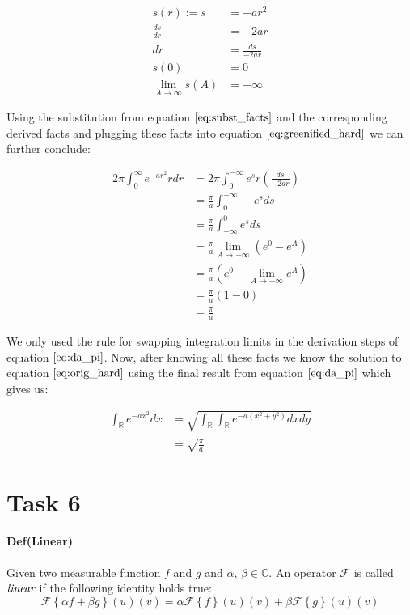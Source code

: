 \documentclass{paper}
\begin{document}
\begin{align}
    s(r) := s &= -ar^2 \\
    \frac{ds}{dr} &= -2ar \\
    dr &= \frac{ds}{-2ar} \\
    s(0) &= 0 \\
    \lim_{A \rightarrow \infty} s(A) &= -\infty
\label{eq:subst_facts}
\end{align}

Using the substitution from equation $\ref{eq:subst_facts}$ and the corresponding derived facts and plugging these facts into equation $\ref{eq:greenified_hard}$ we can further conclude:

\begin{align}
    2\pi \int_{0}^{\infty} e^{-ar^2} r dr 
    &= 2\pi \int_{0}^{-\infty} e^{s} r (\frac{ds}{-2ar}) \\
    &= \frac{\pi}{a} \int_{0}^{-\infty} -e^{s} ds \\
    &= \frac{\pi}{a} \int_{-\infty}^{0} e^{s} ds \\
    &= \frac{\pi}{a} \lim_{A \rightarrow -\infty} \left( e^0 - e^{A} \right) \\
    &= \frac{\pi}{a} \left( e^0 - \lim_{A \rightarrow -\infty} e^{A} \right) \\
    &= \frac{\pi}{a} (1 - 0) \\
    &= \frac{\pi}{a}
\label{eq:da_pi}
\end{align}

We only used the rule for swapping integration limits in the derivation steps of equation $\ref{eq:da_pi}$. Now, after knowing all these facts we know the solution to equation $\ref{eq:orig_hard}$ using the final result from equation $\ref{eq:da_pi}$ which gives us:

\begin{align}
    \int_{\mathbb{R}} e^{-ax^2} dx 
    &= \sqrt{\int_{\mathbb{R}} \int_{\mathbb{R}} e^{-a(x^2 + y^2)} dx dy} \\
    &= \sqrt{\frac{\pi}{a}}
\label{eq:final_helper_thingy}
\end{align}



\section*{Task 6}
\paragraph{Def(Linear)} Given two measurable function $f$ and $g$ and $\alpha$, $\beta \in \mathbb{C}$. An operator $\mathcal{F}$ is called $\emph{linear}$ if the following identity holds true: \\
\begin{equation}
    \mathcal{F} \left \{\alpha f + \beta g \right\}(u)(v) = \alpha \mathcal{F} \left \{f\right\}(u)(v) + \beta \mathcal{F} \left \{g \right\}(u)(v)
\label{eq:lin_op}
\end{equation}
\end{document}
